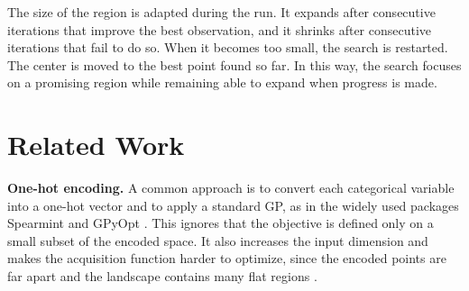 The size of the region is adapted during the run. It expands after consecutive iterations that improve the best observation, and it shrinks after consecutive iterations that fail to do so. When it becomes too small, the search is restarted. The center is moved to the best point found so far. In this way, the search focuses on a promising region while remaining able to expand when progress is made.



\section{Related Work}\label{sec:related-work}


\textbf{One-hot encoding.} A common approach is to convert each categorical variable into a one-hot vector and to apply a standard GP, as in the widely used packages Spearmint \citep{NIPS2012_05311655} and GPyOpt \citep{pmlr-v51-gonzalez16a}. This ignores that the objective is defined only on a small subset of the encoded space. It also increases the input dimension and makes the acquisition function harder to optimize, since the encoded points are far apart and the landscape contains many flat regions \citep{pmlr-v70-rana17a}.

